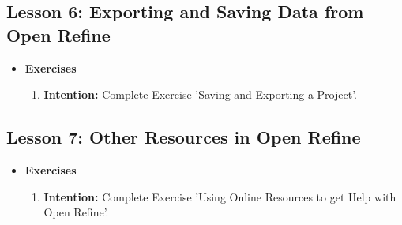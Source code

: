 \documentclass{article}
\begin{document}
\subsection{Lesson 6: Exporting and Saving Data from Open Refine}

\begin{itemize}
\item{\textbf{Exercises}}

\begin{enumerate}

\item{\textbf{Intention:} Complete Exercise 'Saving and Exporting a Project'.}


\end{enumerate}
\end{itemize}




\subsection{Lesson 7: Other Resources in Open Refine}

\begin{itemize}
\item{\textbf{Exercises}}

\begin{enumerate}

\item{\textbf{Intention:} Complete Exercise 'Using Online Resources to get Help with Open Refine'.}


\end{enumerate}
\end{itemize}
\end{document}
